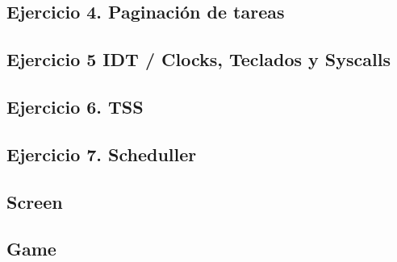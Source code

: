 \documentclass[a4paper,10pt,twoside]{article}
\begin{document}

\newpage
\subsection{Ejercicio 4. Paginaci\'on de tareas}


\newpage
\subsection{Ejercicio 5 IDT / Clocks, Teclados y Syscalls}


\newpage
\subsection{Ejercicio 6. TSS}


\newpage
\subsection{Ejercicio 7. Scheduller}



\newpage
\subsection{Screen}


\newpage
\subsection{Game}

\newpage
\end{document}

